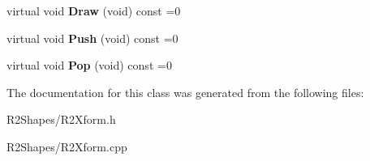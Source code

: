 \begin{DoxyCompactItemize}
\item 
virtual void {\bfseries Draw} (void) const  =0\hypertarget{class_r2_transformation_aa795402b979a0a221977eacfe89f6f44}{}\label{class_r2_transformation_aa795402b979a0a221977eacfe89f6f44}

\item 
virtual void {\bfseries Push} (void) const  =0\hypertarget{class_r2_transformation_afdf5880fc64bdb5f4216fc3272ff0a65}{}\label{class_r2_transformation_afdf5880fc64bdb5f4216fc3272ff0a65}

\item 
virtual void {\bfseries Pop} (void) const  =0\hypertarget{class_r2_transformation_a796c2fb8ab519e2ff4ae461408fc079b}{}\label{class_r2_transformation_a796c2fb8ab519e2ff4ae461408fc079b}

\end{DoxyCompactItemize}


The documentation for this class was generated from the following files\+:\begin{DoxyCompactItemize}
\item 
R2\+Shapes/R2\+Xform.\+h\item 
R2\+Shapes/R2\+Xform.\+cpp\end{DoxyCompactItemize}
